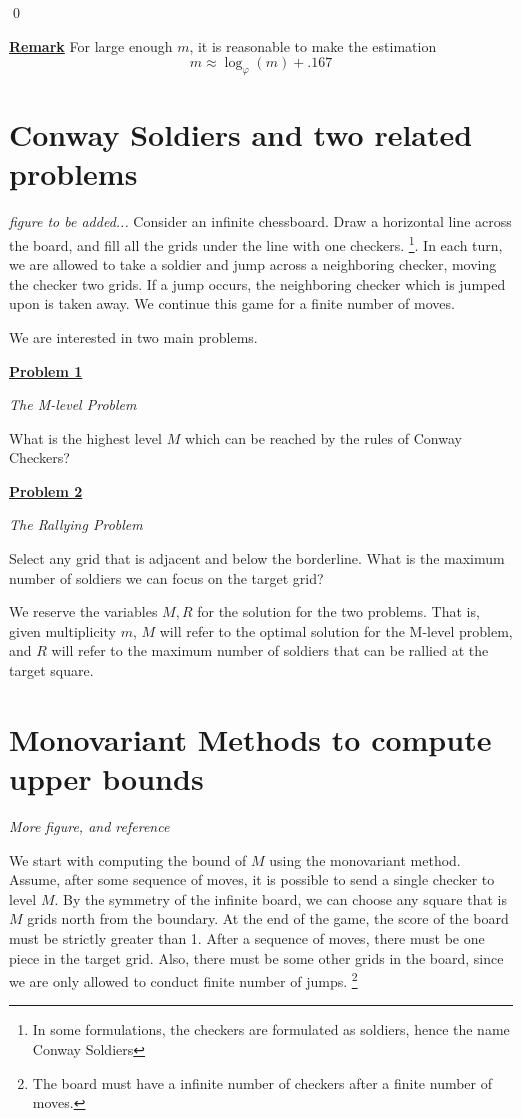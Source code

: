 \documentclass{article}
\newcommand{\new}[1]{
    \vspace{2mm}
    \noindent
    \textbf{
    \underline{#1}}
}
\begin{document}
\hfill \qed

\new{Remark} For large enough $m$, it is reasonable to make the estimation 
\[
    m \approx \log_{\varphi}(m) +.167
\]



\section{Conway Soldiers and two related problems}
\textit{figure to be added...}
Consider an infinite chessboard. Draw a horizontal line 
across the board, and fill all the grids under the line 
with one checkers. \footnote{In some formulations, 
the checkers are formulated as soldiers, hence the name Conway 
Soldiers}. In each turn, we are allowed to take a soldier and 
jump across a neighboring checker, moving the checker two grids. 
If a jump occurs, the neighboring checker which is jumped upon is taken 
away. We continue this game for a finite number of moves. 

We are interested in two main problems. 

\new{Problem 1}
\textit{
 The M-level Problem
}

What is the highest level $M$ which 
can be reached by the rules of Conway Checkers?

\new{Problem 2 }
\textit{
 The Rallying Problem
}

Select any grid that is adjacent and below 
the borderline. What is the maximum number of soldiers we 
can focus on the target grid? 

We reserve the variables $M, R$ for the solution for the 
two problems. That is, given multiplicity $m$, $M$ 
will refer to the optimal solution for the M-level problem, 
and $R$ will refer to the maximum number of soldiers that 
can be rallied at the target square. 

\section{Monovariant Methods to compute upper bounds}
\textit{More figure, and reference}

We start with computing the bound of $M$ using the 
monovariant method. Assume, after some sequence of moves, 
it is possible to send a single checker to level $M$. 
By the symmetry of the infinite board, we can choose 
any square that is $M$ grids north from the boundary. 
At the end of the game, the score of the board must be 
strictly greater than 1. After a sequence of moves, there 
must be one piece in the target grid. Also, there must be 
some other grids in the board, since we are only allowed 
to conduct finite number of jumps. \footnote{The board 
must have a infinite number of checkers after a finite number 
of moves. }
 
\end{document}
